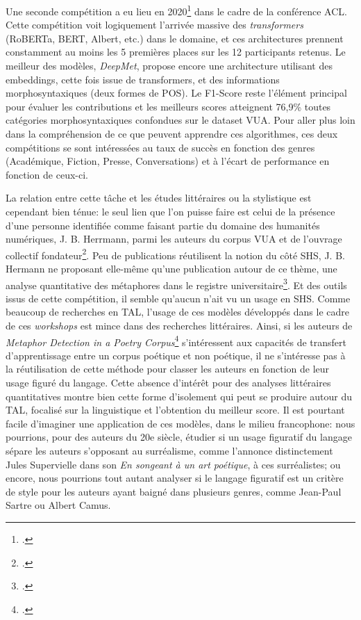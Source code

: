 Une seconde compétition a eu lieu en 2020\footcite{leong_report_2020} dans le cadre de la conférence ACL. Cette compétition voit logiquement l'arrivée massive des \textit{transformers} (RoBERTa, BERT, Albert, etc.) dans le domaine, et ces architectures prennent constamment au moins les 5 premières places sur les 12 participants retenus. Le meilleur des modèles, \textit{DeepMet}, propose encore une architecture utilisant des embeddings, cette fois issue de transformers, et des informations morphosyntaxiques (deux formes de POS). Le F1-Score reste l'élément principal pour évaluer les contributions et les meilleurs scores atteignent 76,9\% toutes catégories morphosyntaxiques confondues sur le dataset VUA. Pour aller plus loin dans la compréhension de ce que peuvent apprendre ces algorithmes, ces deux compétitions se sont intéressées au taux de succès en fonction des genres (Académique, Fiction, Presse, Conversations) et à l'écart de performance en fonction de ceux-ci. %

La relation entre cette tâche et les études littéraires ou la stylistique est cependant bien ténue: le seul lien que l'on puisse faire est celui de la présence d'une personne identifiée comme faisant partie du domaine des humanités numériques, J. B. Herrmann, parmi les auteurs du corpus VUA et de l'ouvrage collectif fondateur\footcite{steen_method_2010}. Peu de publications réutilisent la notion du côté SHS, J. B. Hermann ne proposant elle-même qu'une publication autour de ce thème, une analyse quantitative des métaphores dans le registre universitaire\footcite{herrmann_high_2015}. Et des outils issus de cette compétition, il semble qu'aucun n'ait vu un usage en SHS. Comme beaucoup de recherches en TAL, l'usage de ces modèles développés dans le cadre de ces \textit{workshops} est mince dans des recherches littéraires. Ainsi, si les auteurs de \textit{Metaphor Detection in a Poetry Corpus}\footcite{kesarwani_metaphor_2017} s'intéressent aux capacités de transfert d'apprentissage entre un corpus poétique et non poétique, il ne s'intéresse pas à la réutilisation de cette méthode pour classer les auteurs en fonction de leur usage figuré du langage. Cette absence d'intérêt pour des analyses littéraires quantitatives montre bien cette forme d'isolement qui peut se produire autour du TAL, focalisé sur la linguistique et l'obtention du meilleur score. Il est pourtant facile d'imaginer une application de ces modèles, dans le milieu francophone: nous pourrions, pour des auteurs du 20e siècle, étudier si un usage figuratif du langage sépare les auteurs s'opposant au surréalisme, comme l'annonce distinctement Jules Supervielle dans son \textit{En songeant à un art poétique}, à ces surréalistes; ou encore, nous pourrions tout autant analyser si le langage figuratif est un critère de style pour les auteurs ayant baigné dans plusieurs genres, comme Jean-Paul Sartre ou Albert Camus.

